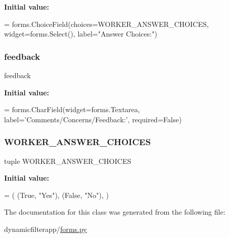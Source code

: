 {\bfseries Initial value\+:}
\begin{DoxyCode}
=  forms.ChoiceField(choices=WORKER\_ANSWER\_CHOICES, 
        widget=forms.Select(), label=\textcolor{stringliteral}{"Answer Choices:"})
\end{DoxyCode}
\mbox{\label{classdynamicfilterapp_1_1forms_1_1_worker_form_aecc50b4643d1ea45de7afe20e729c160}} 
\subsubsection{\texorpdfstring{feedback}{feedback}}
{\footnotesize\ttfamily feedback\hspace{0.3cm}{\ttfamily [static]}}

{\bfseries Initial value\+:}
\begin{DoxyCode}
=  forms.CharField(widget=forms.Textarea, 
        label=\textcolor{stringliteral}{'Comments/Concerns/Feedback:'}, required=\textcolor{keyword}{False})
\end{DoxyCode}
\mbox{\label{classdynamicfilterapp_1_1forms_1_1_worker_form_a82a7fc5c5e889c4eb0460d3f1638425b}} 
\subsubsection{\texorpdfstring{W\+O\+R\+K\+E\+R\+\_\+\+A\+N\+S\+W\+E\+R\+\_\+\+C\+H\+O\+I\+C\+ES}{WORKER\_ANSWER\_CHOICES}}
{\footnotesize\ttfamily tuple W\+O\+R\+K\+E\+R\+\_\+\+A\+N\+S\+W\+E\+R\+\_\+\+C\+H\+O\+I\+C\+ES\hspace{0.3cm}{\ttfamily [static]}}

{\bfseries Initial value\+:}
\begin{DoxyCode}
=  (
        (\textcolor{keyword}{True}, \textcolor{stringliteral}{"Yes"}),
        (\textcolor{keyword}{False}, \textcolor{stringliteral}{"No"}),
    )
\end{DoxyCode}


The documentation for this class was generated from the following file\+:\begin{DoxyCompactItemize}
\item 
dynamicfilterapp/\mbox{\hyperlink{forms_8py}{forms.\+py}}\end{DoxyCompactItemize}
